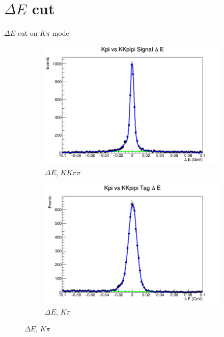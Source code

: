 \documentclass{beamer}
\begin{document}
\section{$\Delta E$ cut}
\begin{frame}{$\Delta E$ cut on $K\pi$ mode}
  \begin{figure}
    \centering
    \begin{subfigure}{0.5\textwidth}
      \centering
      \includegraphics[width=\textwidth]{KpiSignalDeltaE.png}
      \caption{$\Delta E$, $KK\pi\pi$}
    \end{subfigure}%
    \begin{subfigure}{0.5\textwidth}
      \centering
      \includegraphics[width=\textwidth]{KpiTagDeltaE.png}
      \caption{$\Delta E$, $K\pi$}
    \end{subfigure}
  \end{figure}
\end{frame}
\end{document}
